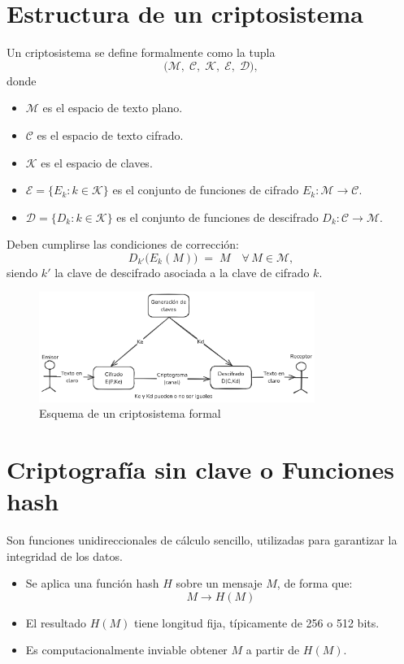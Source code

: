 \section{Estructura de un criptosistema}

Un criptosistema se define formalmente como la tupla
\[
  \bigl(\mathcal M,\;\mathcal C,\;\mathcal K,\;\mathcal E,\;\mathcal D\bigr),
\]
donde
\begin{itemize}
  \item \(\mathcal M\) es el espacio de texto plano.
  \item \(\mathcal C\) es el espacio de texto cifrado.
  \item \(\mathcal K\) es el espacio de claves.
  \item \(\mathcal E=\{E_k: k\in\mathcal K\}\) es el conjunto de funciones de cifrado \(E_k:\mathcal M\to\mathcal C\).
  \item \(\mathcal D=\{D_k: k\in\mathcal K\}\) es el conjunto de funciones de descifrado \(D_k:\mathcal C\to\mathcal M\).
\end{itemize}
Deben cumplirse las condiciones de corrección:
\[
  D_{k'}\bigl(E_k(M)\bigr)\;=\;M
  \quad\forall\,M\in\mathcal M,
\]
siendo \(k'\) la clave de descifrado asociada a la clave de cifrado \(k\).

\begin{figure}[H]
    \centering
    \includegraphics[width=0.8\textwidth]{imagenes/Esquema_criptosistema_cifrado_descifrado.png}
    \caption{Esquema de un criptosistema formal}
    \label{fig:esquema_criptosistema_cifrado_descifrado}
\end{figure}

\section{Criptografía sin clave o Funciones hash}
Son funciones unidireccionales de cálculo sencillo, utilizadas para garantizar la integridad de los datos.

\begin{itemize}
    \item Se aplica una función hash $H$ sobre un mensaje $M$, de forma que: 
    \[
    M \rightarrow H(M)
    \]
    \item El resultado $H(M)$ tiene longitud fija, típicamente de 256 o 512 bits.
    \item Es computacionalmente inviable obtener $M$ a partir de $H(M)$.
\end{itemize}

